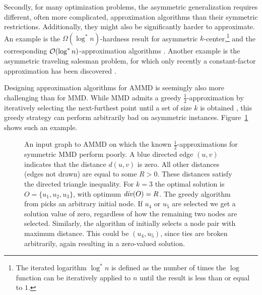 Secondly, for many optimization problems, the asymmetric generalization requires different, often more complicated, approximation algorithms than their symmetric restrictions. 
Additionally, they might also be significantly harder to approximate. An example is the $\Omega(\log^* n)$-hardness result \cite{chuzhoy2005asymmetric} for asymmetric $k$-center,\!\footnote{The iterated logarithm $\log^* n$ is defined as the number of times the $\log$ function can be iteratively applied to $n$ until the result is less than or equal to $1$.} and the corresponding $\mathcal{O}(\log^* n)$-approximation algorithms \cite{archer2001two,panigrahy1998ano}. Another example is the asymmetric traveling salesman problem, for which only recently a constant-factor approximation has been discovered \cite{svensson2020constant}.

Designing approximation algorithms for AMMD is seemingly also more challenging than for MMD.
While MMD admits a greedy $\frac{1}{2}$-approximation by iteratively selecting the next-furthest point until a set of size $k$ is obtained \cite{tamir1991obnoxious,ravi1994heuristic},
this greedy strategy can perform arbitrarily bad on asymmetric instances. Figure~\ref{fig:toyexample_greedy} shows such an example. 


\begin{figure}
  \centering
  \caption{An input graph to AMMD on which the known $\frac{1}{2}$-approximations for symmetric MMD perform poorly. A blue directed edge $(u,v)$ indicates that the distance $d(u,v)$ is zero. All other distances (edges not drawn) are equal to some $R>0$. These distances satisfy the directed triangle inequality. For $k=3$ the optimal solution is $O =\{u_1,u_2,u_3\}$, with optimum $\diver{O}=R$. The greedy algorithm from \cite{tamir1991obnoxious} picks an arbitrary initial node. If $u_4$ or $u_5$ are selected we get a solution value of zero, regardless of how the remaining two nodes are selected. Similarly, the algorithm of \cite{ravi1994heuristic} initially selects a node pair with maximum distance. This could be $(u_4,u_5)$, since ties are broken arbitrarily, again resulting in a zero-valued solution.}
\label{fig:toyexample_greedy}
\end{figure} 

